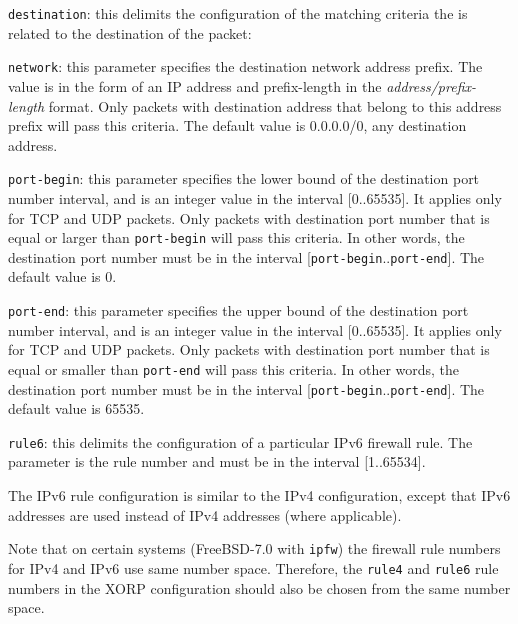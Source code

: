 \begin{description}
\begin{description}
\item{\tt destination}: this delimits the configuration of the matching
  criteria the is related to the destination of the packet:
\begin{description}
\item{\tt network}: this parameter specifies the destination network address
  prefix. The value is in the form of an IP address and prefix-length in
  the {\it address/prefix-length} format. Only packets with destination
  address that belong to this address prefix will pass this criteria.
  The default value is 0.0.0.0/0, \ie any destination address.
\item{\tt port-begin}: this parameter specifies the lower bound of the
  destination port number interval, and is an integer value in the interval
  [0..65535]. It applies only for TCP and UDP packets.
  Only packets with destination port number that is equal or larger than
  {\tt port-begin} will pass this criteria. In other words, the destination
  port number must be in the interval
  [{\tt port-begin}..{\tt port-end}]. The default value is 0.
\item{\tt port-end}: this parameter specifies the upper bound of the
  destination port number interval, and is an integer value in the interval
  [0..65535]. It applies only for TCP and UDP packets.
  Only packets with destination port number that is equal or smaller than
  {\tt port-end} will pass this criteria. In other words, the destination
  port number must be in the interval
  [{\tt port-begin}..{\tt port-end}]. The default value is 65535.
\end{description}

\end{description}

\item{\tt rule6}: this delimits the configuration of a particular
  IPv6 firewall rule. The parameter is the rule number and must be
  in the interval [1..65534].

  The IPv6 rule configuration is similar to the IPv4 configuration,
  except that IPv6 addresses are used instead of IPv4 addresses (where
  applicable).

  Note that on certain systems (\eg FreeBSD-7.0 with {\tt ipfw}) the
  firewall rule numbers for IPv4 and IPv6 use same number
  space. Therefore, the {\tt rule4} and {\tt rule6} rule numbers in the
  XORP configuration should also be chosen from the same number space.

\end{description}

